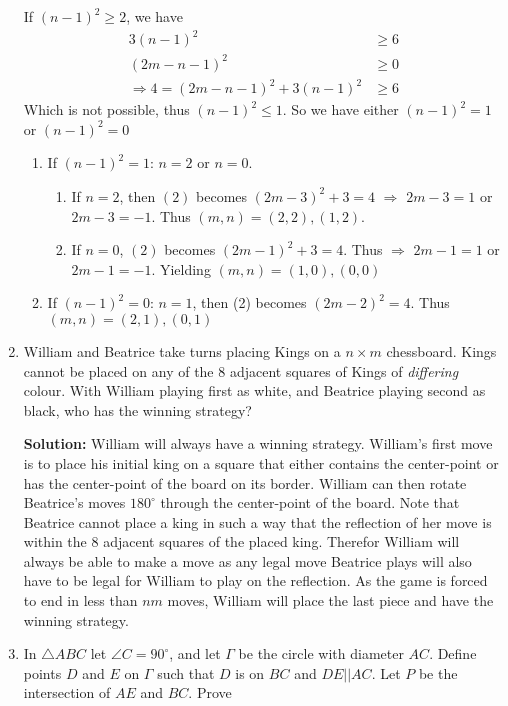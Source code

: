 \documentclass{article}
\begin{document}
\begin{enumerate}[itemsep=\fill]
If $(n-1)^{2} \geq 2$, we have
\begin{align*}
    3(n-1)^{2} & \geq 6 \\
    (2m - n - 1)^{2} & \geq 0 \\
    \Rightarrow 4 = (2m - n - 1)^{2} + 3(n-1)^{2} & \geq 6
\end{align*}
Which is not possible, thus $(n-1)^{2} \leq 1$. So we have either $(n-1)^{2} = 1$ or $(n-1)^{2} = 0$
\begin{enumerate}
\item If $(n-1)^{2} = 1$: $n = 2$ or $n=0$.
\begin{enumerate}
    \item If $n=2$, then $(2)$ becomes $(2m -3)^{2} + 3 = 4$ $\Rightarrow$ $2m - 3 = 1$ or $2m - 3 = -1$. Thus $(m, n) = (2, 2), (1, 2)$. \newline
    \item If $n = 0$, $(2)$ becomes $(2m -1)^{2} + 3 = 4$. Thus $\Rightarrow$ $2m- 1 = 1$ or $2m - 1 = -1$. Yielding $(m, n) = (1, 0), (0, 0)$
\end{enumerate}
\item If $(n-1)^{2} = 0$: $n = 1$, then (2) becomes $(2m - 2)^{2} = 4$. Thus $(m, n) = (2, 1), (0, 1)$
\end{enumerate}

\item %
William and Beatrice take turns placing Kings on a $n \times m$ chessboard.
Kings cannot be placed on any of the 8 adjacent squares of Kings of \emph{differing} colour.
With William playing first as white, and Beatrice playing second as black, who has the winning strategy?

\textbf{Solution:} William will always have a winning strategy. William's first move is to place his initial king on a square that either contains the center-point or has the center-point of the board on its border. William can then rotate Beatrice's moves $180^{\circ}$ through the center-point of the board. Note that Beatrice cannot place a king in such a way that the reflection of her move is within the $8$ adjacent squares of the placed king. Therefor William will always be able to make a move as any legal move Beatrice plays will also have to be legal for William to play on the reflection. As the game is forced to end in less than $nm$ moves, William will place the last piece and have the winning strategy.


\item %
In $\triangle ABC$ let $\angle C = 90^\circ$, and let $\Gamma$ be the circle with diameter $AC$. Define points $D$ and $E$ on $\Gamma$ such that $D$ is on $BC$ and $DE || AC$. Let $P$ be the intersection of $AE$ and $BC$. Prove


\end{enumerate}
\end{document}
